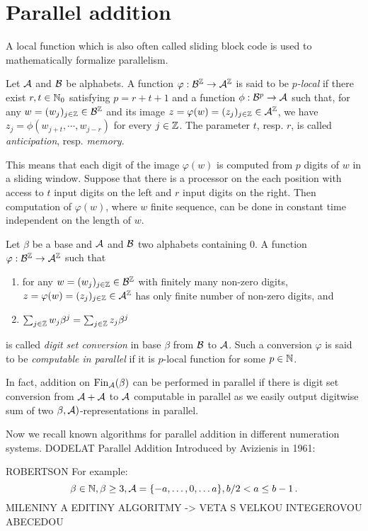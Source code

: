 \section{Parallel addition}
A local function which is also often called sliding block code is used to mathematically formalize parallelism. 
\begin{defn}
Let $\mathcal{A}$ and $\mathcal{B}$ be alphabets. A function $\varphi:\mathcal{B}^{\mathbb{Z}} \rightarrow \mathcal{A}^{\mathbb{Z}}$ is said to be \emph{$p$-local} if there exist $r,t\in\mathbb{N}_0$ satisfying $p=r+t+1$ and a function $\phi: \mathcal{B}^p \rightarrow \mathcal{A}$ such that, for any $w=(w_j)_{j\in\mathbb{Z}}\in\mathcal{B}^{\mathbb{Z}}$ and its image $z=\varphi(w)=(z_j)_{j\in\mathbb{Z}}\in\mathcal{A}^{\mathbb{Z}}$, we have $z_j=\phi(w_{j+t},\cdots,w_{j-r})$ for every $j\in\mathbb{Z}$. The parameter $t$, resp. $r$, is called \emph{anticipation}, resp. \emph{memory}.
\end{defn}
This means that each digit of the image $\varphi(w)$ is computed from $p$ digits of $w$ in a sliding window. Suppose that there is a processor on the each position with access to $t$ input digits on the left and $r$ input digits on the right. Then computation of $\varphi(w)$, where $w$ finite sequence, can be done in constant time independent on the length of $w$.   
  
\begin{defn}
Let $\beta$ be a base and $\mathcal{A}$ and $\mathcal{B}$ two alphabets containing 0. A function $\varphi:\mathcal{B}^{\mathbb{Z}}\rightarrow \mathcal{A}^{\mathbb{Z}}$ such that
  \begin{enumerate}
      \item for any $w=(w_j)_{j\in\mathbb{Z}}\in\mathcal{B}^{\mathbb{Z}}$ with finitely many non-zero digits, $z=\varphi(w)=(z_j)_{j\in\mathbb{Z}}\in\mathcal{A}^{\mathbb{Z}}$ has only finite number of non-zero digits, and
      \item $\sum_{j\in\mathbb{Z}} w_j \beta^j= \sum_{j\in\mathbb{Z}} z_j \beta^j$
  \end{enumerate}
  is called \emph{digit set conversion} in base $\beta$ from $\mathcal{B}$ to $\mathcal{A}$. Such a conversion $\varphi$ is said to be \emph{computable in parallel} if it is $p$-local function for some $p\in\mathbb{N}$. 
\end{defn}
In fact, addition on $\text{Fin}_{\mathcal{A}}(\beta)$ can be performed in parallel if there is digit set conversion from $\mathcal{A}+\mathcal{A}$ to $\mathcal{A}$ computable in  parallel as we easily output digitwise sum of two $\beta,\mathcal{A})$-representations in parallel.   

Now we recall known algorithms for parallel addition in different numeration systems. 
DODELAT 
    {Parallel Addition}
    Introduced by Avizienis in 1961:
  
  ROBERTSON
  For example:
  $$
  \beta \in \mathbb{N}, \beta \geq 3, \mathcal{A}=\{-a, \dots, 0, \dots a\}, b/2 <a \leq b-1\,. 
  $$  
  MILENINY A EDITINY ALGORITMY -> VETA S VELKOU INTEGEROVOU ABECEDOU
  
